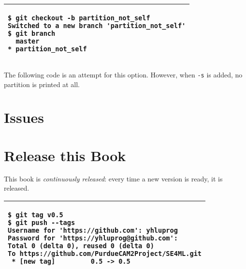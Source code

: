 \vspace{0.2in}
\noindent
\begin{tabular}{|p{5in}|}\hline
\begin{verbatim}
$ git checkout -b partition_not_self
Switched to a new branch 'partition_not_self'
$ git branch
  master
* partition_not_self
\end{verbatim}
\\ \hline
\end{tabular}
\vspace{0.2in}

The following code is an attempt for this option. However,
when {\tt -s} is added, no partition is printed at all.

\resetlinenumber[1]
\linenumbers
\begin{tt}
  
\end{tt}
\nolinenumbers


\section{Issues}

\section{Release this Book}

This book is {\it continuously released}: every time
a new version is ready, it is released.

\vspace{0.2in}
\noindent
\begin{tabular}{|p{5.5in}|}\hline
\begin{verbatim}
$ git tag v0.5
$ git push --tags
Username for 'https://github.com': yhluprog
Password for 'https://yhluprog@github.com': 
Total 0 (delta 0), reused 0 (delta 0)
To https://github.com/PurdueCAM2Project/SE4ML.git
 * [new tag]         0.5 -> 0.5
\end{verbatim}
\\ \hline
\end{tabular}
\vspace{0.2in}
